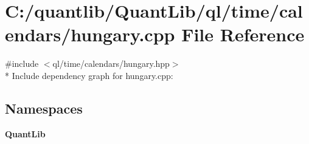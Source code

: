 \section{C\+:/quantlib/\+Quant\+Lib/ql/time/calendars/hungary.cpp File Reference}
\label{hungary_8cpp}
{\ttfamily \#include $<$ql/time/calendars/hungary.\+hpp$>$}\\*
Include dependency graph for hungary.\+cpp\+:
\subsection*{Namespaces}
\begin{DoxyCompactItemize}
\item 
 {\bf Quant\+Lib}
\end{DoxyCompactItemize}
